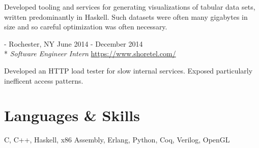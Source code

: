 \documentclass[letterpaper,margin,line,11pt]{resume}
\newcommand{\rurl}[1]{\hfill {\footnotesize \url{#1}}}
\newcommand{\rdate}[1]{\hfill {\small #1}}
\renewcommand{\employer}[5]{\item[#1] - #2 \rdate{#3} \\* #4 \rurl{#5}}
\begin{document}
\begin{resume}
\begin{asparadesc}
        \small
        Developed tooling and services for generating visualizations of tabular data sets, written predominantly in
        Haskell. Such datasets were often many gigabytes in size and so careful optimization was often necessary.
        \normalsize
        \\

        \employer{ShoreTel}{Rochester, NY}{June 2014 - December 2014}{\textit{Software Engineer Intern}}{https://www.shoretel.com/}

        \small
        Developed an HTTP load tester for slow internal services. Exposed particularly inefficent access patterns.
        \normalsize
    \end{asparadesc}

\section{\mysidestyle Languages \& Skills}
    C, C++, Haskell, x86 Assembly, Erlang, Python, Coq, Verilog, OpenGL


\end{resume}
\end{document}
